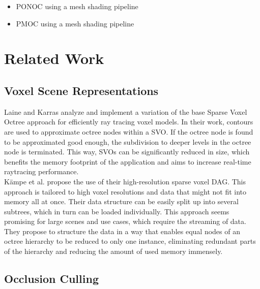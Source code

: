 \documentclass[conference]{IEEEtran}
\begin{document}
\begin{itemize}
    \item \ac{PONOC} using a mesh shading pipeline
    \item \ac{PMOC} using a mesh shading pipeline
\end{itemize}

\section{Related Work}

\subsection{Voxel Scene Representations} \label{subsec-voxel-scn-rep}

\noindent
Laine and Karras \cite{b6} analyze and implement a variation of the base Sparse Voxel Octree
approach for efficiently ray tracing voxel models. In their work, contours are used to
approximate octree nodes within a \ac{SVO}. If the octree node is found
to be approximated good enough, the subdivision to deeper levels in the octree node is
terminated. This way, \ac{SVO}s can be significantly reduced in size, which benefits the memory 
footprint of the application and aims to increase real-time raytracing performance. \\

\noindent
Kämpe et al. \cite{b2} propose the use of their high-resolution sparse voxel \ac{DAG}. 
This approach is tailored to high voxel resolutions and data that might not fit into 
memory all at once. Their data structure can be easily split up into several subtrees, 
which in turn can be loaded individually. This approach seems promising for large scenes 
and use cases, which require the streaming of data. They propose to structure the data in 
a way that enables equal nodes of an octree hierarchy to be reduced to only one instance, 
eliminating redundant parts of the hierarchy and reducing the amount of used memory immensely.

\subsection{Occlusion Culling} \label{subsec-occlusion-culling}
\end{document}
